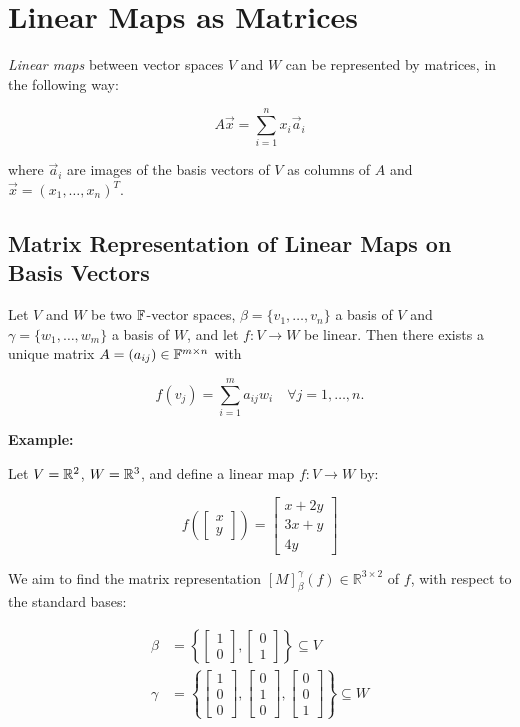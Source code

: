 \section{Linear Maps as Matrices}

\emph{Linear maps} between vector spaces \(V\) and \(W\) can be represented by matrices, in the following way:

\[
    A\vec{x} =  \sum_{i = 1}^{n} x_i \vec{a}_i
\]

where \(\vec{a}_i\) are images of the basis vectors of \(V\) as columns of \(A\) and \(\vec{x} = (x_1, \dots, x_n)^T\).

\subsection{Matrix Representation of Linear Maps on Basis Vectors}

Let \(V\) and \(W\) be two \(\mathbb{F}\)-vector spaces, \(\beta = \{v_1, \dots, v_n\}\) a basis of \(V\) and \( \gamma = \{w_1, \dots, w_m\}\) a basis of 
\(W\), and let \(f : V \to W\) be linear. Then there exists a unique matrix \(A = (a_{ij}) \in \mathbb{F}^{m \times n}\) with

\[
    f(v_j) = \sum_{i=1}^{m} a_{ij}w_i \quad \forall j = 1, \dots, n.
\]

\textbf{Example:}

Let \( V = \mathbb{R}^2 \), \( W = \mathbb{R}^3 \), and define a linear map \( f : V \to W \) by:

\[
    f\left( \begin{bmatrix} x \\ y \end{bmatrix} \right) =
    \begin{bmatrix} x + 2y \\ 3x + y \\ 4y \end{bmatrix}
\]

We aim to find the matrix representation \( [M]_{\beta}^{\gamma}(f) \in \mathbb{R}^{3 \times 2} \) of \( f \), with respect to the standard bases:

\begin{align*}
    \beta  & = \left\{ \begin{bmatrix}1\\0\end{bmatrix}, \begin{bmatrix}0\\1\end{bmatrix} \right\} \subseteq V                                            \\
    \gamma & = \left\{ \begin{bmatrix}1\\0\\0\end{bmatrix}, \begin{bmatrix}0\\1\\0\end{bmatrix}, \begin{bmatrix}0\\0\\1\end{bmatrix} \right\} \subseteq W
\end{align*}

